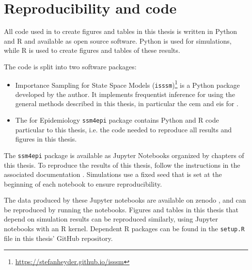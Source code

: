 \chapter{Reproducibility and code}
\label{cha:reproducibility_and_code}
All code used in to create figures and tables in this thesis is written in Python and R  and available as open source software. Python is used for simulations, while R is used to create figures and tables of these results. 

The code is split into two software packages:
\begin{itemize}
    \item Importance Sampling for State Space Models (\texttt{isssm})\footnote{\url{https://stefanheyder.github.io/isssm}} is a Python package developed by the author. It implements frequentist inference for  using the general methods described in this thesis, in particular the \acrshort{cem} and \acrshort{eis} for . 
    \item The  for Epidemiology \texttt{ssm4epi} package contains Python and R code particular to this thesis, i.e. the code needed to reproduce all results and figures in this thesis. 
\end{itemize}

The \texttt{ssm4epi} package is available as Jupyter Notebooks organized by chapters of this thesis. To reproduce the results of this thesis, follow the instructions in the associated documentation . Simulations use a fixed seed that is set at the beginning of each notebook to ensure reproducibility. 

The data produced by these Jupyter notebooks are available on zenodo , and can be reproduced by running the notebooks. Figures and tables in this thesis that depend on simulation results can be reproduced similarly, using Jupyter notebooks with an R kernel. Dependent R packages can be found in the \texttt{setup.R} file in this thesis' GitHub repository.